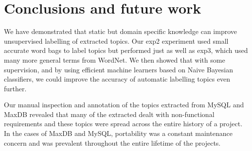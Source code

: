 \documentclass{acm_proc_article-sp}
\begin{document}





\section{Conclusions and future work}

%


We have demonstrated that static but domain specific knowledge can improve unsupervised labelling of extracted topics. Our \textsf{exp2} experiment used small accurate word bags to label topics but performed just as well as \textsf{exp3}, which used many more general terms from WordNet. We then showed that with some supervision, and by using efficient machine learners based on Naive Bayesian classifiers, we could improve the accuracy of automatic labelling topics even further.

Our manual inspection and annotation of the topics extracted from MySQL and MaxDB revealed that many of the extracted dealt with non-functional requirements and these topics were spread across the entire history of a project. In the cases of MaxDB and MySQL, portability was a constant maintenance concern and was prevalent throughout the entire lifetime of the projects.
\end{document}
